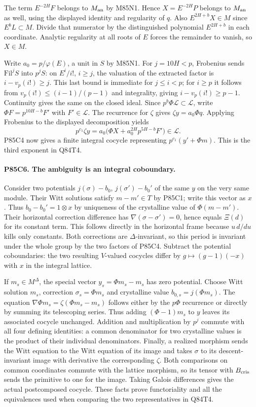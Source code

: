 The term $E^{-2H}F$ belongs to $M_{\rm an}$ by M85N1. Hence
$X=E^{-2H}P$ belongs to $M_{\rm an}$ as well, using the displayed
identity and regularity of $q$. Also $E^{2H+b}X\in M$ since
$E^bL\subset M$. Divide that numerator by the distinguished
polynomial $E^{2H+b}$ in each coordinate. Analytic regularity at
all roots of $E$ forces the remainder to vanish, so $X\in M$.

Write $a_0=p/\varphi(E)$, a unit in $S$ by M85N1.
For $j=10H<p$, Frobenius sends $\mathrm{Fil}^jS$ into
$p^jS$: on $E^i/i!$, $i\ge j$, the valuation of the extracted
factor is $i-v_p(i!)\ge j$. This last bound is immediate for
$j\le i<p$; for $i\ge p$ it follows from
$v_p(i!)\le(i-1)/(p-1)$ and integrality, giving $i-v_p(i!)\ge p-1$.
Continuity gives the same on the closed ideal. Since
$p^b\Phi\mathcal L\subset\mathcal L$, write
$\Phi F=p^{10H-b}F'$ with $F'\in\mathcal L$.
The recurrence for $\zeta$ gives $\zeta y=a_0\Phi q$. Applying
Frobenius to the displayed decomposition yields
\[
 p^{c_1}\zeta y
     =a_0\big(\Phi X+a_0^{2H}p^{5H-b}F'\big)\in\mathcal L .
\]
P85C4 now gives a finite integral cocycle representing
$p^{c_1}(y'+\Phi m)$. This is the third exponent in Q84T4.

\paragraph{P85C6. The ambiguity is an integral coboundary.}
Consider two potentials $j(\sigma)-b_0$, $j(\sigma')-b_0'$ of
the same $y$ on the very same module. Their Witt solutions satisfy
$m-m'\in T$ by P85C1; write this vector as $x$. Thus
$b_0-b_0'=1\otimes x$ by uniqueness of the crystalline value of
$\Phi(m-m')$. Their horizontal correction difference has
$\nabla(\sigma-\sigma')=0$, hence equals $\Xi(d)$ for its
constant term. This follows directly in the horizontal frame
because $u\,d/du$ kills only constants. Both corrections are
$\Delta$-invariant, so this period is invariant under the whole
group by the two factors of P85C4. Subtract the potential
coboundaries: the two resulting $V$-valued cocycles differ by
$g\mapsto(g-1)(-x)$ with $x$ in the integral lattice.

If $m_s\in M^\Delta$, the special vector $y_s=\Phi m_s-m_s$
has zero potential. Choose Witt solution $m_s$, correction
$\sigma_s=\Phi m_s$ and crystalline value $b_{0,s}=j(\Phi m_s)$.
The equation $\nabla\Phi m_s=\zeta(\Phi m_s-m_s)$ follows either
by the $p\Phi$ recurrence or directly by summing its telescoping
series. Thus adding $(\Phi-1)m_s$ to $y$ leaves its associated
cocycle unchanged. Addition and multiplication by $p^j$ commute
with all four defining identities: a common denominator for two
crystalline values is the product of their individual denominators.
Finally, a realized morphism sends the Witt equation to the Witt
equation of its image and takes $\sigma$ to its descent-invariant
image with derivative the corresponding $\zeta$. Both comparisons
on common coordinates commute with the lattice morphism, so
its tensor with $B_{\rm cris}$ sends the primitive to one for the
image. Taking Galois differences gives the actual postcomposed
cocycle. These facts prove functoriality and all the equivalences
used when comparing the two representatives in Q84T4.
